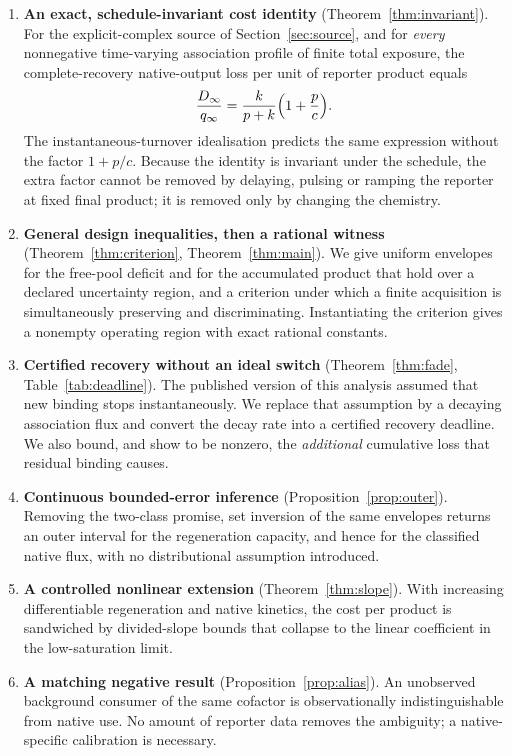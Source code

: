 \documentclass[11pt]{article}
\theoremstyle{definition}
\theoremstyle{remark}
\begin{document}
\begin{enumerate}
\item \textbf{An exact, schedule-invariant cost identity}
(Theorem~\ref{thm:invariant}). For the explicit-complex source of
Section~\ref{sec:source}, and for \emph{every} nonnegative time-varying
association profile of finite total exposure, the complete-recovery
native-output loss per unit of reporter product equals
\[
\frac{D_\infty}{q_\infty}=\frac{k}{p+k}\Bigl(1+\frac{p}{c}\Bigr).
\]
The instantaneous-turnover idealisation predicts the same expression without
the factor $1+p/c$. Because the identity is invariant under the schedule, the
extra factor cannot be removed by delaying, pulsing or ramping the reporter at
fixed final product; it is removed only by changing the chemistry.

\item \textbf{General design inequalities, then a rational witness}
(Theorem~\ref{thm:criterion}, Theorem~\ref{thm:main}). We give uniform
envelopes for the free-pool deficit and for the accumulated product that hold
over a declared uncertainty region, and a criterion under which a finite
acquisition is simultaneously preserving and discriminating. Instantiating the
criterion gives a nonempty operating region with exact rational constants.

\item \textbf{Certified recovery without an ideal switch}
(Theorem~\ref{thm:fade}, Table~\ref{tab:deadline}). The published version of
this analysis assumed that new binding stops instantaneously. We replace that
assumption by a decaying association flux and convert the decay rate into a
certified recovery deadline. We also bound, and show to be nonzero, the
\emph{additional} cumulative loss that residual binding causes.

\item \textbf{Continuous bounded-error inference}
(Proposition~\ref{prop:outer}). Removing the two-class promise, set inversion
of the same envelopes returns an outer interval for the regeneration capacity,
and hence for the classified native flux, with no distributional assumption
introduced.

\item \textbf{A controlled nonlinear extension}
(Theorem~\ref{thm:slope}). With increasing differentiable regeneration and
native kinetics, the cost per product is sandwiched by divided-slope bounds
that collapse to the linear coefficient in the low-saturation limit.

\item \textbf{A matching negative result} (Proposition~\ref{prop:alias}). An
unobserved background consumer of the same cofactor is observationally
indistinguishable from native use. No amount of reporter data removes the
ambiguity; a native-specific calibration is necessary.
\end{enumerate}
\end{document}
